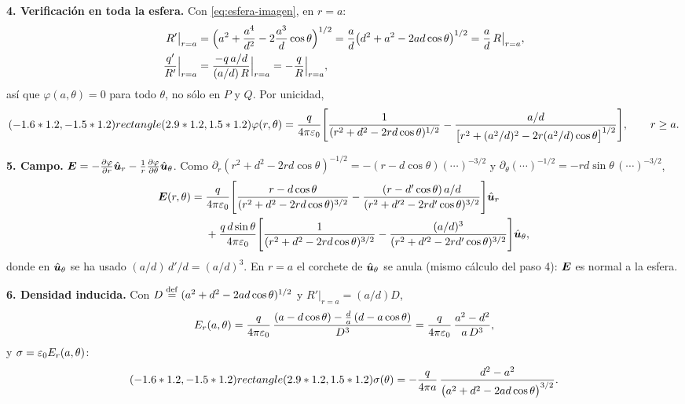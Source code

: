\documentclass[11pt,a4paper,twoside]{article}
\begin{document}
\begin{resolucion}
\textbf{4. Verificación en toda la esfera.} Con \eqref{eq:esfera-imagen}, en $r=a$:
\begin{align*}
  R'\big|_{r=a}&=\Bigl(a^{2}+\frac{a^{4}}{d^{2}}-2\frac{a^{3}}{d}\cos\theta\Bigr)^{1/2}
  =\frac{a}{d}\bigl(d^{2}+a^{2}-2ad\cos\theta\bigr)^{1/2}=\frac ad\,R\big|_{r=a},\\
  \frac{q'}{R'}\Big|_{r=a}&=\frac{-q\,a/d}{(a/d)\,R}\Big|_{r=a}=-\frac{q}{R}\Big|_{r=a},
\end{align*}
así que $\varphi(a,\theta)=0$ para todo $\theta$, no sólo en $P$ y $Q$. Por unicidad,
\begin{equation}\label{eq:esfera-phi}
  (-1.6*1.2,-1.5*1.2) rectangle (2.9*1.2,1.5*1.2){\varphi(r,\theta)=\frac{q}{4\pi\varepsilon_{0}}\Biggl[\frac{1}{(r^{2}+d^{2}-2rd\cos\theta)^{1/2}}
  -\frac{a/d}{\bigl[r^{2}+(a^{2}/d)^{2}-2r(a^{2}/d)\cos\theta\bigr]^{1/2}}\Biggr],\qquad r\ge a.}
\end{equation}

\textbf{5. Campo.} $\bm{E}=-\frac{\partial \varphi}{\partial r}\hat{\bm{u}}_r-\frac1r\frac{\partial \varphi}{\partial \theta}\hat{\bm{u}}_\theta$.
Como $\partial_r(r^{2}+d^{2}-2rd\cos\theta)^{-1/2}=-(r-d\cos\theta)(\cdots)^{-3/2}$ y
$\partial_\theta(\cdots)^{-1/2}=-rd\sin\theta\,(\cdots)^{-3/2}$,
\begin{equation}\label{eq:esfera-E}
\begin{aligned}
  \bm{E}(r,\theta)={}&\frac{q}{4\pi\varepsilon_{0}}\Biggl[\frac{r-d\cos\theta}{(r^{2}+d^{2}-2rd\cos\theta)^{3/2}}
  -\frac{(r-d'\cos\theta)\,a/d}{(r^{2}+d'^{2}-2rd'\cos\theta)^{3/2}}\Biggr]\hat{\bm{u}}_r\\
  &+\frac{q\,d\sin\theta}{4\pi\varepsilon_{0}}\Biggl[\frac{1}{(r^{2}+d^{2}-2rd\cos\theta)^{3/2}}
  -\frac{(a/d)^{3}}{(r^{2}+d'^{2}-2rd'\cos\theta)^{3/2}}\Biggr]\hat{\bm{u}}_\theta ,
\end{aligned}
\end{equation}
donde en $\hat{\bm{u}}_\theta$ se ha usado $(a/d)\,d'/d=(a/d)^{3}$. En $r=a$ el corchete de
$\hat{\bm{u}}_\theta$ se anula (mismo cálculo del paso 4): $\bm{E}$ es normal a la esfera.

\textbf{6. Densidad inducida.} Con $D\mathrel{\overset{\mathrm{def}}{=}}(a^{2}+d^{2}-2ad\cos\theta)^{1/2}$ y $R'|_{r=a}=(a/d)D$,
\[
  E_r(a,\theta)=\frac{q}{4\pi\varepsilon_{0}}\,\frac{(a-d\cos\theta)-\frac da\,(d-a\cos\theta)}{D^{3}}
  =\frac{q}{4\pi\varepsilon_{0}}\,\frac{a^{2}-d^{2}}{a\,D^{3}},
\]
y $\sigma=\varepsilon_{0} E_r(a,\theta)$:
\begin{equation}\label{eq:esfera-sigma}
  (-1.6*1.2,-1.5*1.2) rectangle (2.9*1.2,1.5*1.2){\sigma(\theta)=-\frac{q}{4\pi a}\,\frac{d^{2}-a^{2}}{\bigl(a^{2}+d^{2}-2ad\cos\theta\bigr)^{3/2}}.}
\end{equation}


\end{resolucion}
\end{document}
